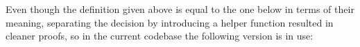 \begin{itemize}
    Even though the definition given above is equal to the one below in terms of their meaning, separating the decision by introducing a helper function resulted in cleaner proofs, so in the current codebase the following version is in use:
    \begin{code}
        \>[2]\AgdaSpace{}%
        \AgdaSymbol{:}\AgdaSpace{}%
        \AgdaSpace{}%
        \AgdaSpace{}%
        \AgdaSpace{}%
        \AgdaSpace{}%
        \AgdaSpace{}%
        \AgdaSpace{}%
        \<%
        \\
        \>[2]\AgdaSpace{}%
        \AgdaSpace{}%
        \AgdaSpace{}%
        \AgdaSpace{}%
        \AgdaSymbol{=}\AgdaSpace{}%
        \AgdaSpace{}%
        \AgdaSpace{}%
        \AgdaSpace{}%
        \<%
        \\
        \>[2]\AgdaSpace{}%
        \AgdaSpace{}%
        \AgdaSpace{}%
        \AgdaSpace{}%
        \AgdaSymbol{=}\AgdaSpace{}%
        \<%
        \\
        \\[\AgdaEmptyExtraSkip]%
        \>[2]\AgdaSpace{}%
        \AgdaSymbol{:}\AgdaSpace{}%
        \AgdaSpace{}%
        \AgdaSpace{}%
        \AgdaSpace{}%
        \AgdaSpace{}%
        \<%
        \\
        \>[2]\AgdaSpace{}%
        \AgdaSymbol{(}\AgdaSpace{}%
        \AgdaOperator{\AgdaInductiveConstructor{,}}\AgdaSpace{}%
        \AgdaSymbol{)}\AgdaSpace{}%
        \AgdaSpace{}%
        \AgdaSpace{}%
        \AgdaSymbol{=}\AgdaSpace{}%
        \AgdaSpace{}%
        \AgdaSymbol{(}\AgdaSpace{}%
        \AgdaSpace{}%
        \AgdaSpace{}%
        \AgdaSymbol{)}\AgdaSpace{}%
        \AgdaSpace{}%
        \<%
    \end{code}
\end{itemize}


